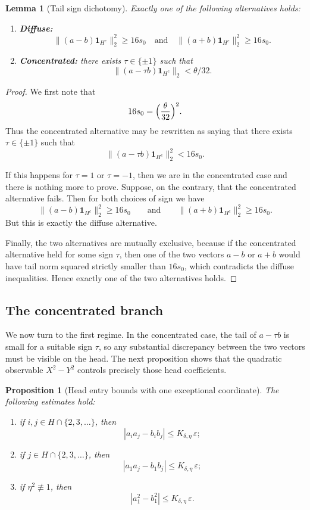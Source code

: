 \documentclass[11pt]{amsart}
\numberwithin{equation}{section}
\newtheorem{proposition}[theorem]{Proposition}
\newtheorem{lemma}[theorem]{Lemma}
\theoremstyle{definition}
\theoremstyle{remark}
\newcommand{\eps}{\varepsilon}
\newcommand{\norm}[1]{\lVert #1 \rVert}
\begin{document}
\begin{lemma}[Tail sign dichotomy]\label{lem:dichotomy}
Exactly one of the following alternatives holds:
\begin{enumerate}[label=\rm(\roman*)]
\item \textbf{Diffuse:}
\[
\norm{(a-b)\mathbf 1_{H^c}}_2^2\ge16s_0
\quad\text{and}\quad
\norm{(a+b)\mathbf 1_{H^c}}_2^2\ge16s_0.
\]
\item \textbf{Concentrated:} there exists $\tau\in\{\pm1\}$ such that
\[
\norm{(a-\tau b)\mathbf 1_{H^c}}_2<\theta/32.
\]
\end{enumerate}
\end{lemma}

\begin{proof}
We first note that
\[
16s_0=\Bigl(\frac{\theta}{32}\Bigr)^2.
\]
Thus the concentrated alternative may be rewritten as saying that there exists
$\tau\in\{\pm1\}$ such that
\[
\norm{(a-\tau b)\mathbf 1_{H^c}}_2^2<16s_0.
\]

If this happens for $\tau=1$ or $\tau=-1$, then we are in the concentrated
case and there is nothing more to prove.  Suppose, on the contrary, that the
concentrated alternative fails.  Then for both choices of sign we have
\[
\norm{(a-b)\mathbf 1_{H^c}}_2^2\ge16s_0
\qquad\text{and}\qquad
\norm{(a+b)\mathbf 1_{H^c}}_2^2\ge16s_0.
\]
But this is exactly the diffuse alternative.

Finally, the two alternatives are mutually exclusive, because if the
concentrated alternative held for some sign $\tau$, then one of the two vectors
$a-b$ or $a+b$ would have tail norm squared strictly smaller than $16s_0$,
which contradicts the diffuse inequalities.  Hence exactly one of the two
alternatives holds.
\end{proof}

\subsection{The concentrated branch}

We now turn to the first regime.  In the concentrated case, the tail of
$a-\tau b$ is small for a suitable sign $\tau$, so any substantial discrepancy
between the two vectors must be visible on the head.  The next proposition
shows that the quadratic observable $X^2-Y^2$ controls precisely those
head coefficients.

\begin{proposition}[Head entry bounds with one exceptional coordinate]
\label{prop:head-entry}
The following estimates hold:
\begin{enumerate}[label=\rm(\arabic*)]
\item if $i,j\in H\cap\{2,3,\dots\}$, then
\[
|a_i a_j-b_i b_j|\le K_{\delta,\eta}\,\eps;
\]
\item if $j\in H\cap\{2,3,\dots\}$, then
\[
|a_1a_j-b_1b_j|\le K_{\delta,\eta}\,\eps;
\]
\item if $\eta^2\not\equiv1$, then
\[
|a_1^2-b_1^2|\le K_{\delta,\eta}\,\eps.
\]
\end{enumerate}
\end{proposition}
\end{document}
